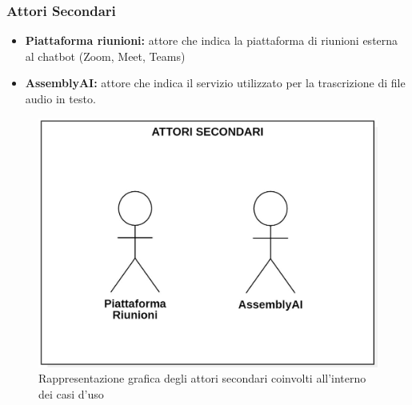 \subsubsection{Attori Secondari}
\begin{itemize}
    \item \textbf{Piattaforma riunioni:} attore che indica la piattaforma di riunioni esterna al chatbot (Zoom, Meet, Teams)
    \item \textbf{AssemblyAI:} attore che indica il servizio utilizzato per la trascrizione di file audio in testo.
\end{itemize}
\begin{figure}[H]
    \centering
    \includegraphics[scale=0.4]{images/attori_secondari.jpg} 
    \caption{Rappresentazione grafica degli attori secondari coinvolti all'interno dei casi d'uso}
\end{figure}
\newpage